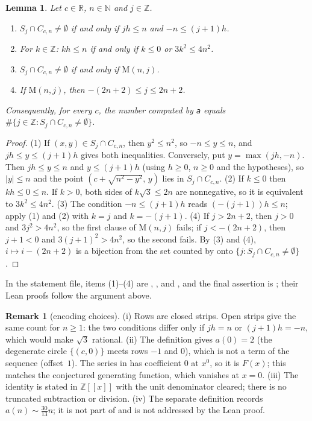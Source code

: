\documentclass[11pt]{amsart}
\theoremstyle{plain}
\newtheorem{lemma}[theorem]{Lemma}
\theoremstyle{definition}
\newtheorem{remark}[theorem]{Remark}
\newcommand{\N}{\mathbb{N}}
\newcommand{\Z}{\mathbb{Z}}
\newcommand{\R}{\mathbb{R}}
\newcommand{\fps}{\Z[\![x]\!]}
\newcommand{\MI}{\mathrm{M}}
\begin{document}
\begin{lemma}\label{lem:geom}
Let $c\in\R$, $n\in\N$ and $j\in\Z$.
\begin{enumerate}
\item $S_j\cap C_{c,n}\ne\emptyset$ if and only if $jh\le n$ and $-n\le(j+1)h$.
\item For $k\in\Z$: $kh\le n$ if and only if $k\le0$ or $3k^2\le4n^2$.
\item $S_j\cap C_{c,n}\ne\emptyset$ if and only if $\MI(n,j)$.
\item If $\MI(n,j)$, then $-(2n+2)\le j\le 2n+2$.
\end{enumerate}
Consequently, for every $c$, the number computed by \textup{\texttt{a}} equals $\#\{j\in\Z:S_j\cap C_{c,n}\ne\emptyset\}$.
\end{lemma}

\begin{proof}
(1) If $(x,y)\in S_j\cap C_{c,n}$, then $y^2\le n^2$, so $-n\le y\le n$, and $jh\le y\le(j+1)h$ gives both inequalities. Conversely, put $y=\max(jh,-n)$. Then $jh\le y\le n$ and $y\le(j+1)h$ (using $h\ge0$, $n\ge0$ and the hypotheses), so $|y|\le n$ and the point $(c+\sqrt{n^2-y^2},\,y)$ lies in $S_j\cap C_{c,n}$.
(2) If $k\le0$ then $kh\le0\le n$. If $k>0$, both sides of $k\sqrt3\le2n$ are nonnegative, so it is equivalent to $3k^2\le4n^2$.
(3) The condition $-n\le(j+1)h$ reads $(-(j+1))h\le n$; apply (1) and (2) with $k=j$ and $k=-(j+1)$.
(4) If $j>2n+2$, then $j>0$ and $3j^2>4n^2$, so the first clause of $\MI(n,j)$ fails; if $j<-(2n+2)$, then $j+1<0$ and $3(j+1)^2>4n^2$, so the second fails.
By (3) and (4), $i\mapsto i-(2n+2)$ is a bijection from the set counted by  onto $\{j:S_j\cap C_{c,n}\ne\emptyset\}$.
\end{proof}

In the statement file, items (1)--(4) are , ,  and , and the final assertion is ; their Lean proofs follow the argument above.

\begin{remark}[encoding choices]\label{rem:enc}
(i) Rows are closed strips. Open strips give the same count for $n\ge1$: the two conditions differ only if $jh=n$ or $(j+1)h=-n$, which would make $\sqrt3$ rational.
(ii) The definition gives $a(0)=2$ (the degenerate circle $\{(c,0)\}$ meets rows $-1$ and $0$), which is not a term of the sequence (offset~$1$). The series in  has coefficient $0$ at $x^0$, so it is $F(x)$; this matches the conjectured generating function, which vanishes at $x=0$.
(iii) The identity is stated in $\fps$ with the unit denominator cleared; there is no truncated subtraction or division.
(iv) The separate definition  records $a(n)\sim\frac{30}{13}n$; it is not part of  and is not addressed by the Lean proof.
\end{remark}
\end{document}
